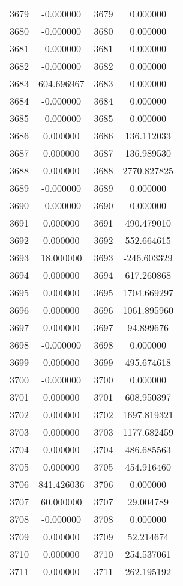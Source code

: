 \documentclass[12pt]{article}
\begin{document}
\begin{longtable}{@{}cccc@{}}
3679 & -0.000000 & 3679 & 0.000000 \\
3680 & -0.000000 & 3680 & 0.000000 \\
3681 & -0.000000 & 3681 & 0.000000 \\
3682 & -0.000000 & 3682 & 0.000000 \\
3683 & 604.696967 & 3683 & 0.000000 \\
3684 & -0.000000 & 3684 & 0.000000 \\
3685 & -0.000000 & 3685 & 0.000000 \\
3686 & 0.000000 & 3686 & 136.112033 \\
3687 & 0.000000 & 3687 & 136.989530 \\
3688 & 0.000000 & 3688 & 2770.827825 \\
3689 & -0.000000 & 3689 & 0.000000 \\
3690 & -0.000000 & 3690 & 0.000000 \\
3691 & 0.000000 & 3691 & 490.479010 \\
3692 & 0.000000 & 3692 & 552.664615 \\
3693 & 18.000000 & 3693 & -246.603329 \\
3694 & 0.000000 & 3694 & 617.260868 \\
3695 & 0.000000 & 3695 & 1704.669297 \\
3696 & 0.000000 & 3696 & 1061.895960 \\
3697 & 0.000000 & 3697 & 94.899676 \\
3698 & -0.000000 & 3698 & 0.000000 \\
3699 & 0.000000 & 3699 & 495.674618 \\
3700 & -0.000000 & 3700 & 0.000000 \\
3701 & 0.000000 & 3701 & 608.950397 \\
3702 & 0.000000 & 3702 & 1697.819321 \\
3703 & 0.000000 & 3703 & 1177.682459 \\
3704 & 0.000000 & 3704 & 486.685563 \\
3705 & 0.000000 & 3705 & 454.916460 \\
3706 & 841.426036 & 3706 & 0.000000 \\
3707 & 60.000000 & 3707 & 29.004789 \\
3708 & -0.000000 & 3708 & 0.000000 \\
3709 & 0.000000 & 3709 & 52.214674 \\
3710 & 0.000000 & 3710 & 254.537061 \\
3711 & 0.000000 & 3711 & 262.195192 \\

\end{longtable}
\end{document}
